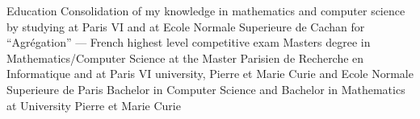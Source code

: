 \begin{rubric}{\color{ForestGreen} Education}
  Consolidation of my knowledge in mathematics and computer science by
  studying at Paris VI and at Ecole Normale Superieure de Cachan for
  ``Agr\'egation'' --- French highest level competitive exam
  Masters degree in Mathematics/Computer Science at the Master Parisien
  de Recherche en Informatique and at Paris VI university, Pierre et
  Marie Curie and Ecole Normale Superieure de Paris
  Bachelor in Computer Science and Bachelor in Mathematics at University Pierre et Marie Curie


\end{rubric}
